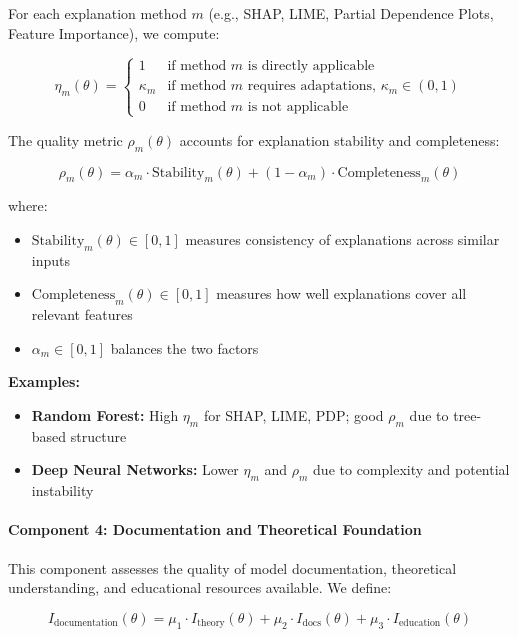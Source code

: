 \documentclass[11pt,a4paper]{article}
\begin{document}
For each explanation method $m$ (e.g., SHAP, LIME, Partial Dependence Plots, Feature Importance), we compute:

\begin{equation}
\eta_m(\theta) = \begin{cases}
1 & \text{if method } m \text{ is directly applicable} \\
\kappa_m & \text{if method } m \text{ requires adaptations, } \kappa_m \in (0,1) \\
0 & \text{if method } m \text{ is not applicable}
\end{cases}
\end{equation}

The quality metric $\rho_m(\theta)$ accounts for explanation stability and completeness:

\begin{equation}
\rho_m(\theta) = \alpha_m \cdot \text{Stability}_m(\theta) + (1-\alpha_m) \cdot \text{Completeness}_m(\theta)
\end{equation}

where:
\begin{itemize}
    \item $\text{Stability}_m(\theta) \in [0,1]$ measures consistency of explanations across similar inputs
    \item $\text{Completeness}_m(\theta) \in [0,1]$ measures how well explanations cover all relevant features
    \item $\alpha_m \in [0,1]$ balances the two factors
\end{itemize}

\textbf{Examples:}
\begin{itemize}
    \item \textbf{Random Forest:} High $\eta_m$ for SHAP, LIME, PDP; good $\rho_m$ due to tree-based structure
    \item \textbf{Deep Neural Networks:} Lower $\eta_m$ and $\rho_m$ due to complexity and potential instability
\end{itemize}

\paragraph{Component 4: Documentation and Theoretical Foundation}

This component assesses the quality of model documentation, theoretical understanding, and educational resources available. We define:

\begin{equation}
I_{\text{documentation}}(\theta) = \mu_1 \cdot I_{\text{theory}}(\theta) + \mu_2 \cdot I_{\text{docs}}(\theta) + \mu_3 \cdot I_{\text{education}}(\theta)
\label{eq:documentation}
\end{equation}
\end{document}
